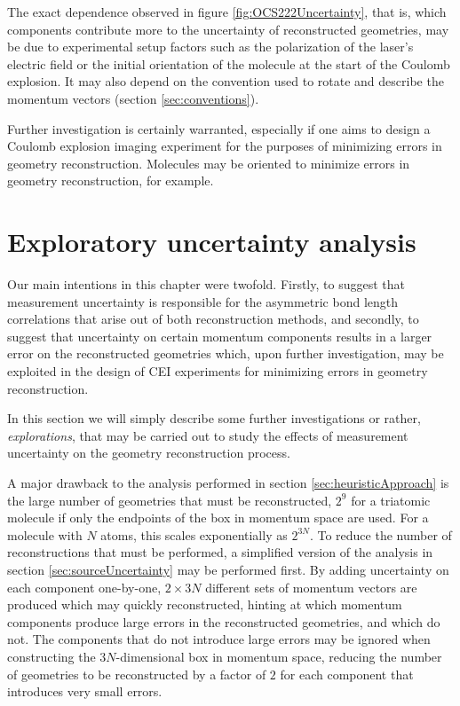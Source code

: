 The exact dependence observed in figure \ref{fig:OCS222Uncertainty}, that is, which components contribute more to the uncertainty of reconstructed geometries, may be due to experimental setup factors such as the polarization of the laser's electric field or the initial orientation of the molecule at the start of the Coulomb explosion. It may also depend on the convention used to rotate and describe the momentum vectors (section \ref{sec:conventions}).

Further investigation is certainly warranted, especially if one aims to design a Coulomb explosion imaging experiment for the purposes of minimizing errors in geometry reconstruction. Molecules may be oriented to minimize errors in geometry reconstruction, for example.

\section{Exploratory uncertainty analysis} \label{sec:uncertaintyAnalysis}
Our main intentions in this chapter were twofold. Firstly, to suggest that measurement uncertainty is responsible for the asymmetric bond length correlations that arise out of both reconstruction methods, and secondly, to suggest that uncertainty on certain momentum components results in a larger error on the reconstructed geometries which, upon further investigation, may be exploited in the design of CEI experiments for minimizing errors in geometry reconstruction.

In this section we will simply describe some further investigations or rather, \emph{explorations}, that may be carried out to study the effects of measurement uncertainty on the geometry reconstruction process.

A major drawback to the analysis performed in section \ref{sec:heuristicApproach} is the large number of geometries that must be reconstructed, $2^9$ for a triatomic molecule if only the endpoints of the box in momentum space are used. For a molecule with $N$ atoms, this scales exponentially as $2^{3N}$. To reduce the number of reconstructions that must be performed, a simplified version of the analysis in section \ref{sec:sourceUncertainty} may be performed first. By adding uncertainty on each component one-by-one, $2\times3N$ different sets of momentum vectors are produced which may quickly reconstructed, hinting at which momentum components produce large errors in the reconstructed geometries, and which do not. The components that do not introduce large errors may be ignored when constructing the $3N$-dimensional box in momentum space, reducing the number of geometries to be reconstructed by a factor of $2$ for each component that introduces very small errors.

